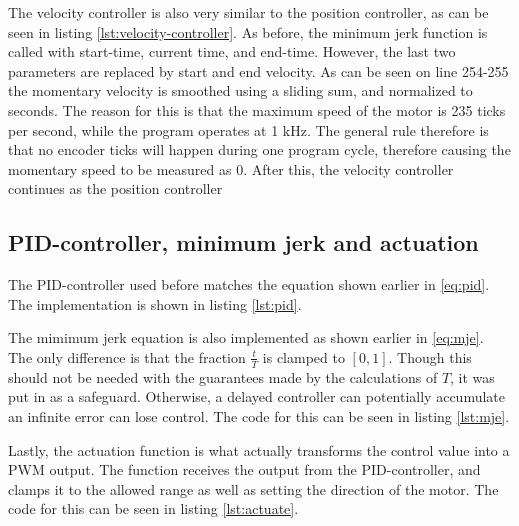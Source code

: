 \documentclass[11pt]{article}
\begin{document}


The velocity controller is also very similar to the position controller, as can be seen in listing \vref{lst:velocity-controller}. As before, the minimum jerk function is called with start-time, current time, and end-time. However, the last two parameters are replaced by  start and end velocity. As can be seen on line 254-255 the momentary velocity is smoothed using a sliding sum, and normalized to seconds. The reason for this is that the maximum speed of the motor is 235 ticks per second, while the program operates at 1 kHz. The general rule therefore is that no encoder ticks will happen during one program cycle, therefore causing the momentary speed to be measured as 0. After this, the velocity controller continues as the position controller




\subsection{PID-controller, minimum jerk and actuation}
The PID-controller used before matches the equation shown earlier in \vref{eq:pid}. The implementation is shown in listing \vref{lst:pid}.



The mimimum jerk equation is also implemented as shown earlier  in \vref{eq:mje}. The only difference is that the fraction $\frac{t}{T}$ is clamped to $[0,1]$. Though this should not be needed with the guarantees made by the calculations of $T$, it was put in as a safeguard. Otherwise, a delayed controller can potentially accumulate an infinite error can lose control. The code for this can be seen in listing \vref{lst:mje}.\par



Lastly, the actuation function is what actually transforms the control value into a PWM output. The function receives the output from the PID-controller, and clamps it to the allowed range as well as setting the direction of the motor. The code for this can be seen in listing \vref{lst:actuate}.
\end{document}
